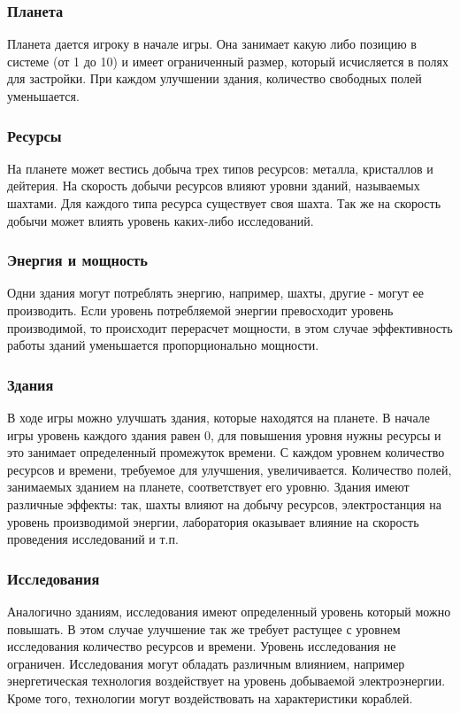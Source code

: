 \subsubsection{Планета}
Планета дается игроку в начале игры. Она занимает какую либо позицию в системе (от 1 до 10) и имеет ограниченный размер, который исчисляется в полях для застройки. При каждом улучшении здания, количество свободных полей уменьшается. 

\subsubsection{Ресурсы}
На планете может вестись добыча трех типов ресурсов: металла, кристаллов и дейтерия. На скорость добычи ресурсов влияют уровни зданий, называемых шахтами. Для каждого типа ресурса существует своя шахта. Так же на скорость добычи может влиять уровень каких-либо исследований.

\subsubsection{Энергия и мощность}
Одни здания могут потреблять энергию, например, шахты, другие - могут ее производить. Если уровень потребляемой энергии превосходит уровень производимой, то происходит перерасчет мощности, в этом случае эффективность работы зданий уменьшается пропорционально мощности.  

\subsubsection{Здания}
В ходе игры можно улучшать здания, которые находятся на планете. В начале игры уровень каждого здания равен 0, для повышения уровня нужны ресурсы и это занимает определенный промежуток времени. С каждом уровнем количество ресурсов и времени, требуемое для улучшения, увеличивается. Количество полей, занимаемых зданием на планете, соответствует его уровню. Здания имеют различные эффекты: так, шахты влияют на добычу ресурсов, электростанция на уровень производимой энергии, лаборатория оказывает влияние на скорость проведения исследований и т.п.

\subsubsection{Исследования}
Аналогично зданиям, исследования имеют определенный уровень который можно повышать. В этом случае улучшение так же требует растущее с уровнем исследования количество ресурсов и времени. Уровень исследования не ограничен. Исследования могут обладать различным влиянием, например энергетическая технология воздействует на уровень добываемой электроэнергии. Кроме того, технологии могут воздействовать на характеристики кораблей. 

